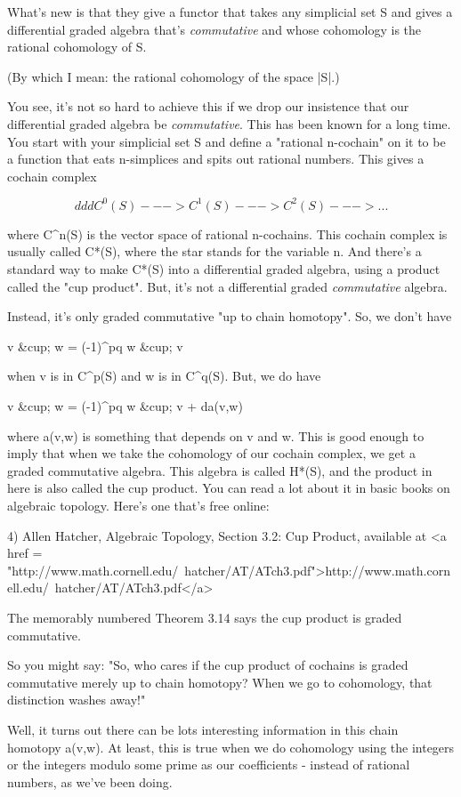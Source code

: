 What's new is that they give a functor that takes any simplicial set S
and gives a differential graded algebra that's \emph{commutative} and whose
cohomology is the rational cohomology of S.  

(By which I mean: the rational cohomology of the space |S|.)

You see, it's not so hard to achieve this if we drop our insistence
that our differential graded algebra be \emph{commutative}.  This has been
known for a long time.  You start with your simplicial set S and
define a "rational n-cochain" on it to be a function that eats
n-simplices and spits out rational numbers.  This gives a cochain
complex
         
$$
       d          d          d
C^{0}(S) ---> C^{1}(S) ---> C^{2}(S) ---> ...
$$
    

where C^{n}(S) is the vector space of rational n-cochains.
This cochain complex is usually called C*(S), where the star stands
for the variable n.  And there's a standard way to make C*(S) into a
differential graded algebra, using a product called the "cup
product".  But, it's not a differential graded
\emph{commutative} algebra.

Instead, it's only graded commutative "up to chain
homotopy".  So, we don't have

v &cup; w = (-1)^{pq} w &cup; v

when v is in C^{p}(S) and w is in C^{q}(S).  But, we do have 

v &cup; w = (-1)^{pq} w &cup; v + da(v,w)

where a(v,w) is something that depends on v and w.  This is good
enough to imply that when we take the cohomology of our cochain
complex, we get a graded commutative algebra.  This algebra is called
H*(S), and the product in here is also called the cup product.  You
can read a lot about it in basic books on algebraic topology.  Here's
one that's free online:

4) Allen Hatcher, Algebraic Topology, Section 3.2: Cup Product, 
available at <a href = "http://www.math.cornell.edu/~hatcher/AT/ATch3.pdf">http://www.math.cornell.edu/~hatcher/AT/ATch3.pdf</a>

The memorably numbered Theorem 3.14 says the cup product is graded
commutative.

So you might say: "So, who cares if the cup product of cochains is
graded commutative merely up to chain homotopy?  When we go to
cohomology, that distinction washes away!"

Well, it turns out there can be lots interesting information in this
chain homotopy a(v,w).  At least, this is true when we do cohomology
using the integers or the integers modulo some prime as our
coefficients - instead of rational numbers, as we've been doing.

